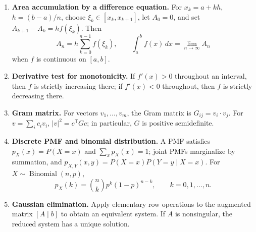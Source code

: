 \begin{enumerate}[label=\normalfont 2.1.\arabic*.,ref=2.1.\arabic*]
\begin{equation*}
\begin{aligned}
\end{aligned}
\end{equation*}
This rule is exact on subintervals where $f$ is linear.
\item \label{formula-2-1-17} \textbf{Area accumulation by a difference equation.} For $x_k=a+kh$, $h=(b-a)/n$, choose $\xi_k\in[x_k,x_{k+1}]$, let $A_0=0$, and set $A_{k+1}-A_k=hf(\xi_k)$. Then
\begin{equation*}\tag{2.1.17.1}
A_n=h\sum_{k=0}^{n-1}f(\xi_k),\qquad \int_a^b f(x)\,dx=\lim_{n\to\infty}A_n
\end{equation*}
when $f$ is continuous on $[a,b]$.
\item \label{formula-2-1-18} \textbf{Derivative test for monotonicity.} If $f'(x)>0$ throughout an interval, then $f$ is strictly increasing there; if $f'(x)<0$ throughout, then $f$ is strictly decreasing there.
\item \label{formula-2-1-19} \textbf{Gram matrix.} For vectors $v_1,\ldots,v_m$, the Gram matrix is $G_{ij}=v_i\cdot v_j$. For $v=\sum_i c_i v_i$, $|v|^2=c^{\mathsf T}Gc$; in particular, $G$ is positive semidefinite.
\item \label{formula-2-1-20} \textbf{Discrete PMF and binomial distribution.} A PMF satisfies $p_X(x)=P(X=x)$ and $\sum_xp_X(x)=1$; joint PMFs marginalize by summation, and $p_{X,Y}(x,y)=P(X=x)P(Y=y\mid X=x)$. For $X\sim\operatorname{Binomial}(n,p)$,
\begin{equation*}\tag{2.1.20.1}
p_X(k)=\binom nkp^k(1-p)^{n-k},\qquad k=0,1,\ldots,n.
\end{equation*}
\item \label{formula-2-1-21} \textbf{Gaussian elimination.} Apply elementary row operations to the augmented matrix $[A\mid b]$ to obtain an equivalent system. If $A$ is nonsingular, the reduced system has a unique solution.
\end{enumerate}

